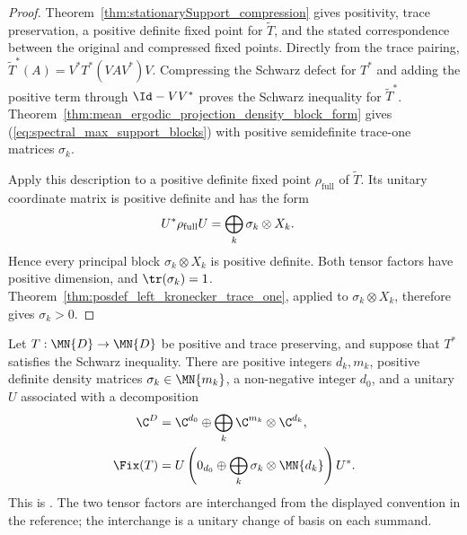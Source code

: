 \begin{proof}
    \leanok
    Theorem~\ref{thm:stationarySupport_compression} gives positivity, trace
    preservation, a positive definite fixed point for $\widetilde T$, and the
    stated correspondence between the original and compressed fixed points.
    Directly from the trace pairing,
    $\widetilde T^*(A)=V^*T^*(VAV^*)V$. Compressing the Schwarz defect for
    $T^*$ and adding the positive term through $\Id-VV^*$ proves the Schwarz
    inequality for $\widetilde T^*$.
    Theorem~\ref{thm:mean_ergodic_projection_density_block_form} gives
    (\ref{eq:spectral_max_support_blocks}) with positive semidefinite
    trace-one matrices $\sigma_k$.

    Apply this description to a positive definite fixed point
    $\rho_{\mathrm{full}}$ of $\widetilde T$. Its unitary coordinate matrix
    is positive definite and has the form
    \begin{align}
        U^*\rho_{\mathrm{full}}U
        &=\bigoplus_k\sigma_k\otimes X_k.
        \notag
    \end{align}
    Hence every principal block $\sigma_k\otimes X_k$ is positive definite.
    Both tensor factors have positive dimension, and $\tr(\sigma_k)=1$.
    Theorem~\ref{thm:posdef_left_kronecker_trace_one}, applied to
    $\sigma_k\otimes X_k$, therefore gives $\sigma_k>0$.
\end{proof}

\begin{theorem}%
    \label{thm:wolf_6_14}
    \leanok
    Let $T:\MN{D}\to\MN{D}$ be positive and trace preserving, and suppose
    that $T^*$ satisfies the Schwarz inequality. There are positive integers
    $d_k,m_k$, positive definite density matrices
    $\sigma_k\in\MN{m_k}$, a non-negative integer $d_0$, and a unitary $U$
    associated with a decomposition
    \begin{align}
        \C^D
        &=\C^{d_0}\oplus
          \bigoplus_k\C^{m_k}\otimes\C^{d_k},
        \notag\\
        \Fix(T)
        &=U\left(0_{d_0}\oplus
          \bigoplus_k\sigma_k\otimes\MN{d_k}\right)U^*.
        \label{eq:spectral_fixed_density_blocks}
    \end{align}
    This is \cite[Theorem~6.14 and Equation~(6.63)]{Wolf2012Quantum}.
    The two tensor factors are interchanged from the displayed convention in
    the reference; the interchange is a unitary change of basis on each
    summand.
\end{theorem}


